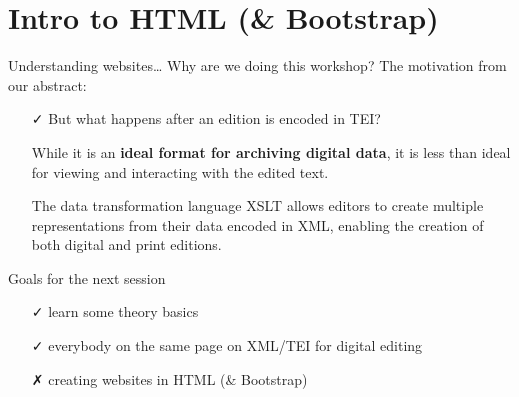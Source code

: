 

\section{Intro to HTML (\& Bootstrap)}

\begin{frame}{Understanding websites\dots}
    Why are we doing this workshop? The motivation from our abstract:
    \begin{itemize}
        \item[\textcolor{w3schools}{\faCheck}] But what happens after an edition is encoded in TEI? 
        \item[\textcolor{w3schools}{\faHandORight}] While it is an \textbf{ideal format for archiving digital data}, it is \alert{less than ideal for viewing and interacting with the edited text.}
        \item[\textcolor{w3schools}{\faHandORight}] The data transformation language XSLT allows editors to create multiple representations from their data encoded in XML, enabling the creation of both digital and print editions. 
    \end{itemize}
    
    \begin{block}{Goals for the next session}
    \begin{enumerate}
        \item[\textcolor{w3schools}{\faCheck}] learn some theory basics
        \item[\textcolor{w3schools}{\faCheck}] everybody on the same page on XML/TEI for digital editing
        \item[\textcolor{alert}{\faClose}] creating websites in HTML (\& Bootstrap)
    \end{enumerate}
    \end{block}
\end{frame}



